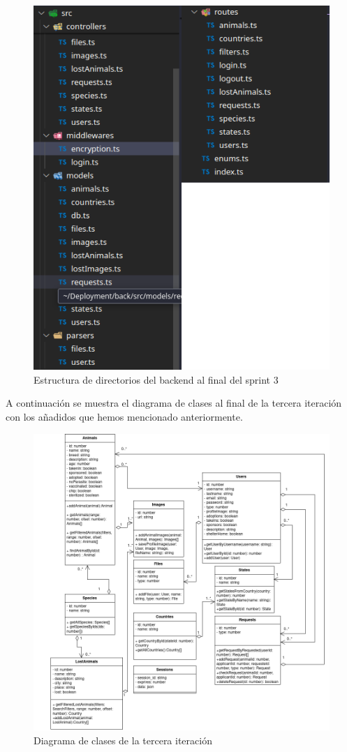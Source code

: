 \begin{figure}[H]
	\centering
	\includegraphics[width=0.7\linewidth]{"sprint 3/structuraBack"}
	\caption{Estructura de directorios del backend al final del sprint 3}
	\label{fig:structuraback}
\end{figure}

A continuación se muestra el diagrama de clases al final de la tercera iteración con los añadidos que hemos mencionado anteriormente.

\pagebreak

\begin{figure}[H]
	\hspace*{-3.5cm}  
	\includegraphics[width=1.5\linewidth]{"sprint 3/clases"}
	\caption{Diagrama de clases de la tercera iteración}
	\label{fig:clases3}
\end{figure}

